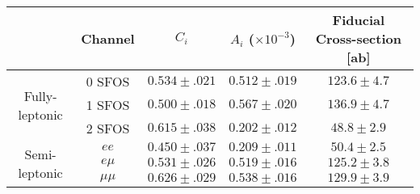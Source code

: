 \begin{tabular}{|cc||c|c|c|}
\hline
& Channel & $C_i$  & $A_i$ ($\times 10^{-3}$) & Fiducial Cross-section [ab]\\
\hline\hline
\multirow{3}{*}{Fully-leptonic} & 0 SFOS &  $0.534 \pm .021$ & $0.512 \pm .019$ & $123.6 \pm 4.7$\\
				& 1 SFOS &  $0.500 \pm .018$ & $0.567 \pm .020$ & $136.9 \pm 4.7$\\
                                & 2 SFOS &  $0.615 \pm .038$ & $0.202 \pm .012$ & $48.8  \pm 2.9$ \\
\hline
\multirow{3}{*}{Semi-leptonic} & $ee$     & $0.450 \pm .037$ & $0.209 \pm .011$ & $50.4  \pm 2.5$\\
                               & $e\mu$   & $0.531 \pm .026$ & $0.519 \pm .016$ & $125.2 \pm 3.8$ \\
                               & $\mu\mu$ & $0.626 \pm .029$ & $0.538 \pm .016$ & $129.9 \pm 3.9$ \\
\hline
\end{tabular}
